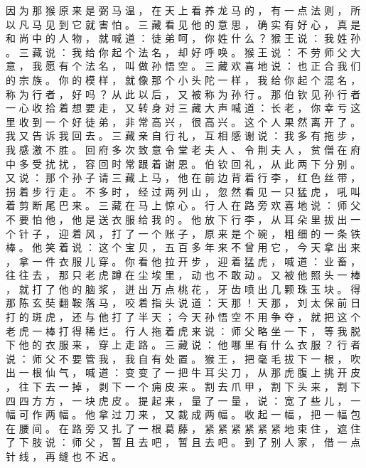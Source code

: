 {因 为 那 猴 原 来 是 弼 马 温 ， 在 天 上 看 养 龙 马 的 ， 有 一 点 法 则 ， 所 以 凡 马 见 到 它 就 害 怕 。
三 藏 看 见 他 的 意 思 ， 确 实 有 好 心 ， 真 是 和 尚 中 的 人 物 ， 就 喊 道 ： 徒 弟 呵 ， 你 姓 什 么 ？ 猴 王 说 ： 我 姓 孙 。
三 藏 说 ： 我 给 你 起 个 法 名 ， 却 好 呼 唤 。
猴 王 说 ： 不 劳 师 父 大 意 ， 我 愿 有 个 法 名 ， 叫 做 孙 悟 空 。
三 藏 欢 喜 地 说 ： 也 正 合 我 们 的 宗 族 。
你 的 模 样 ， 就 像 那 个 小 头 陀 一 样 ， 我 给 你 起 个 混 名 ， 称 为 行 者 ， 好 吗 ？
从 此 以 后 ， 又 被 称 为 孙 行 。
那 伯 钦 见 孙 行 者 一 心 收 拾 着 想 要 走 ， 又 转 身 对 三 藏 大 声 喊 道 ： 长 老 ， 你 幸 亏 这 里 收 到 一 个 好 徒 弟 ， 非 常 高 兴 ， 很 高 兴 。
这 个 人 果 然 离 开 了 。
我 又 告 诉 我 回 去 。
三 藏 亲 自 行 礼 ， 互 相 感 谢 说 ： 我 多 有 拖 步 ， 我 感 激 不 胜 。
回 府 多 次 致 意 令 堂 老 夫 人 、 令 荆 夫 人 ， 贫 僧 在 府 中 多 受 扰 扰 ， 容 回 时 常 跟 着 谢 恩 。
伯 钦 回 礼 ， 从 此 两 下 分 别 。
又 说 ： 那 个 孙 子 请 三 藏 上 马 ， 他 在 前 边 背 着 行 李 ， 红 色 丝 带 ， 拐 着 步 行 走 。
不 多 时 ， 经 过 两 列 山 ， 忽 然 看 见 一 只 猛 虎 ， 吼 叫 着 剪 断 尾 巴 来 。
三 藏 在 马 上 惊 心 。
行 人 在 路 旁 欢 喜 地 说 ： 师 父 不 要 怕 他 ， 他 是 送 衣 服 给 我 的 。
他 放 下 行 李 ， 从 耳 朵 里 拔 出 一 个 针 子 ， 迎 着 风 ， 打 了 一 个 账 子 ， 原 来 是 个 碗 ， 粗 细 的 一 条 铁 棒 。
他 笑 着 说 ： 这 个 宝 贝 ， 五 百 多 年 来 不 曾 用 它 ， 今 天 拿 出 来 ， 拿 一 件 衣 服 儿 穿 。
你 看 他 拉 开 步 ， 迎 着 猛 虎 ， 喊 道 ： 业 畜 ， 往 往 去 ， 那 只 老 虎 蹲 在 尘 埃 里 ， 动 也 不 敢 动 。
又 被 他 照 头 一 棒 ， 就 打 了 他 的 脑 浆 ， 迸 出 万 点 桃 花 ， 牙 齿 喷 出 几 颗 珠 玉 块 。
得 那 陈 玄 奘 翻 鞍 落 马 ， 咬 着 指 头 说 道 ： 天 那 ！ 天 那 ， 刘 太 保 前 日 打 的 斑 虎 ， 还 与 他 打 了 半 天 ； 今 天 孙 悟 空 不 用 争 夺 ， 就 把 这 个 老 虎 一 棒 打 得 稀 烂 。
行 人 拖 着 虎 来 说 ： 师 父 略 坐 一 下 ， 等 我 脱 下 他 的 衣 服 来 ， 穿 上 走 路 。
三 藏 说 ： 他 哪 里 有 什 么 衣 服 ？ 行 者 说 ： 师 父 不 要 管 我 ， 我 自 有 处 置 。
猴 王 ， 把 毫 毛 拔 下 一 根 ， 吹 出 一 根 仙 气 ， 喊 道 ： 变 变 了 一 把 牛 耳 尖 刀 ， 从 那 虎 腹 上 挑 开 皮 ， 往 下 去 一 掉 ， 剥 下 一 个 痈 皮 来 。
割 去 爪 甲 ， 割 下 头 来 ， 割 下 四 四 方 方 ， 一 块 虎 皮 。
提 起 来 ， 量 了 一 量 ， 说 ： 宽 了 些 儿 ， 一 幅 可 作 两 幅 。
他 拿 过 刀 来 ， 又 裁 成 两 幅 。
收 起 一 幅 ， 把 一 幅 包 在 腰 间 。
在 路 旁 又 扎 了 一 根 葛 藤 ， 紧 紧 紧 紧 紧 紧 地 束 住 ， 遮 住 了 下 肢 说 ： 师 父 ， 暂 且 去 吧 ， 暂 且 去 吧 。
到 了 别 人 家 ， 借 一 点 针 线 ， 再 缝 也 不 迟 。
}
